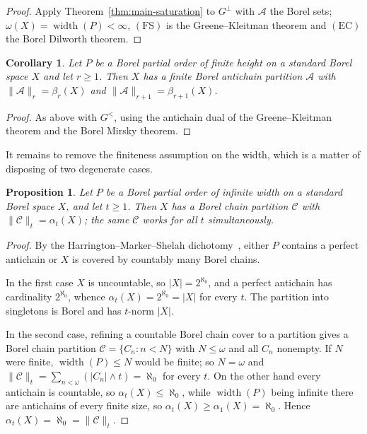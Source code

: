 \documentclass[11pt,reqno]{amsart}
\theoremstyle{plain}
\newtheorem{proposition}[theorem]{Proposition}
\newtheorem{corollary}[theorem]{Corollary}
\theoremstyle{definition}
\theoremstyle{remark}
\newcommand{\wdt}{\operatorname{width}}
\newcommand{\cl}{\omega}
\begin{document}
\begin{proof}
Apply Theorem~\ref{thm:main-saturation} to $G^{\perp}$ with $\mathcal A$ the
Borel sets; $\cl(X)=\wdt(P)<\infty$, $\mathrm{(FS)}$ is the Greene--Kleitman
theorem and $\mathrm{(EC)}$ the Borel Dilworth theorem.
\end{proof}

\begin{corollary}
\label{cor:borel-antichain}
Let $P$ be a Borel partial order of finite height on a standard Borel space $X$
and let $r\ge1$. Then $X$ has a finite Borel antichain partition
$\mathcal A$ with $\lVert\mathcal A\rVert_r=\beta_r(X)$ and
$\lVert\mathcal A\rVert_{r+1}=\beta_{r+1}(X)$.
\end{corollary}

\begin{proof}
As above with $G^{<}$, using the antichain dual of the Greene--Kleitman
theorem and the Borel Mirsky theorem.
\end{proof}

It remains to remove the finiteness assumption on the width, which is a matter
of disposing of two degenerate cases.

\begin{proposition}
\label{prop:infinite-width}
Let $P$ be a Borel partial order of infinite width on a standard Borel space
$X$, and let $t\ge1$. Then $X$ has a Borel chain partition $\mathcal C$ with
$\lVert\mathcal C\rVert_t=\alpha_t(X)$; the same $\mathcal C$ works for all
$t$ simultaneously.
\end{proposition}

\begin{proof}
By the Harrington--Marker--Shelah dichotomy~\cite{HarringtonMarkerShelah1988},
either $P$ contains a perfect antichain or $X$ is covered by countably many
Borel chains.

In the first case $X$ is uncountable, so $|X|=2^{\aleph_0}$, and a perfect
antichain has cardinality $2^{\aleph_0}$, whence
$\alpha_t(X)=2^{\aleph_0}=|X|$ for every $t$. The partition into singletons is
Borel and has $t$-norm $|X|$.

In the second case, refining a countable Borel chain cover to a partition
gives a Borel chain partition $\mathcal C=\{C_n:n<N\}$ with $N\le\omega$ and
all $C_n$ nonempty. If $N$ were finite, $\wdt(P)\le N$ would be finite; so
$N=\omega$ and $\lVert\mathcal C\rVert_t=\sum_{n<\omega}(|C_n|\wedge
t)=\aleph_0$ for every $t$. On the other hand every antichain is countable, so
$\alpha_t(X)\le\aleph_0$, while $\wdt(P)$ being infinite there are antichains
of every finite size, so $\alpha_t(X)\ge\alpha_1(X)=\aleph_0$. Hence
$\alpha_t(X)=\aleph_0=\lVert\mathcal C\rVert_t$.
\end{proof}
\end{document}
